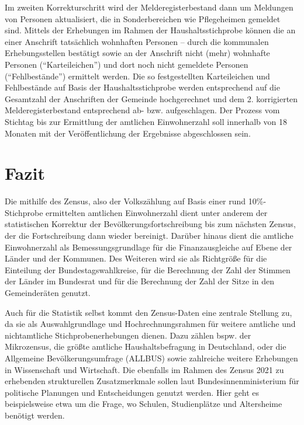 Im zweiten Korrekturschritt wird der Melderegisterbestand dann um Meldungen von Personen aktualisiert, die in Sonderbereichen wie Pflegeheimen gemeldet sind. Mittels der Erhebungen im Rahmen der Haushaltsstichprobe können die an einer Anschrift tatsächlich wohnhaften Personen – durch die kommunalen Erhebungsstellen bestätigt sowie an der Anschrift nicht (mehr) wohnhafte Personen (``Karteileichen'') und dort noch nicht gemeldete Personen (``Fehlbestände'') ermittelt werden. Die so festgestellten Karteileichen und Fehlbestände auf Basis der Haushaltsstichprobe werden entsprechend auf die Gesamtzahl der Anschriften der Gemeinde hochgerechnet und dem 2. korrigierten Melderegisterbestand entsprechend ab- bzw. aufgeschlagen. Der Prozess vom Stichtag bis zur Ermittlung der amtlichen Einwohnerzahl soll innerhalb von 18 Monaten mit der Veröffentlichung der Ergebnisse abgeschlossen sein.

\section{Fazit}
Die mithilfe des Zensus, also der Volkszählung auf Basis einer rund 10\%-Stichprobe ermittelten amtlichen Einwohnerzahl dient unter anderem der statistischen Korrektur der Bevölkerungsfortschreibung bis zum nächsten Zensus, der die Fortschreibung dann wieder bereinigt. Darüber hinaus dient die amtliche Einwohnerzahl als Bemessungsgrundlage für die Finanzausgleiche auf Ebene der Länder und der Kommunen. Des Weiteren wird sie als Richtgröße für die Einteilung der Bundestagswahlkreise, für die Berechnung der Zahl der Stimmen der Länder im Bundesrat und für die Berechnung der Zahl der Sitze in den Gemeinderäten genutzt.\par

Auch für die Statistik selbst kommt den Zensus-Daten eine zentrale Stellung zu, da sie als Auswahlgrundlage und Hochrechnungsrahmen für weitere amtliche und nichtamtliche Stichprobenerhebungen dienen. Dazu zählen bspw. der Mikrozensus, die größte amtliche Haushaltsbefragung in Deutschland, oder die Allgemeine Bevölkerungsumfrage (ALLBUS) sowie zahlreiche weitere Erhebungen in Wissenschaft und Wirtschaft. Die ebenfalls im Rahmen des Zensus 2021 zu erhebenden strukturellen Zusatzmerkmale sollen laut Bundesinnenministerium für politische Planungen und Entscheidungen genutzt werden. Hier geht es beispielsweise etwa um die Frage, wo Schulen, Studienplätze und Altersheime benötigt werden.
